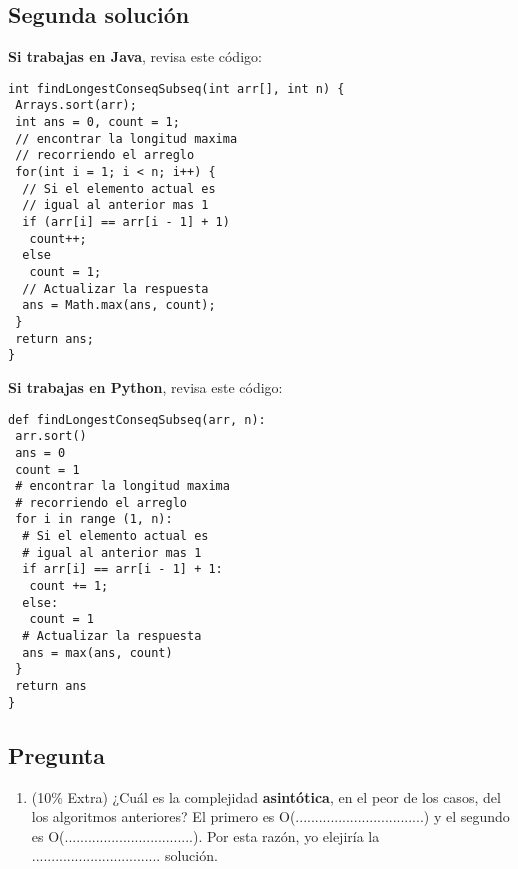 \documentclass[10 pt]{article}
\begin{document}
\begin{multicols}{2}
\subsection{Segunda solución}

\textbf{Si trabajas en Java}, revisa este código: 



{\footnotesize
\begin{lstlisting}
int findLongestConseqSubseq(int arr[], int n) {
 Arrays.sort(arr);   
 int ans = 0, count = 1;    
 // encontrar la longitud maxima
 // recorriendo el arreglo
 for(int i = 1; i < n; i++) {         
  // Si el elemento actual es
  // igual al anterior mas 1
  if (arr[i] == arr[i - 1] + 1)
   count++;
  else
   count = 1;        
  // Actualizar la respuesta
  ans = Math.max(ans, count);
 }
 return ans;
}
\end{lstlisting}
}

\textbf{Si trabajas en Python}, revisa este código:

{\footnotesize
\begin{lstlisting}
def findLongestConseqSubseq(arr, n):
 arr.sort()
 ans = 0 
 count = 1
 # encontrar la longitud maxima
 # recorriendo el arreglo
 for i in range (1, n): 
  # Si el elemento actual es
  # igual al anterior mas 1
  if arr[i] == arr[i - 1] + 1:
   count += 1;
  else:
   count = 1
  # Actualizar la respuesta
  ans = max(ans, count)
 }
 return ans
}
\end{lstlisting}
}


\subsection{Pregunta}

\begin{enumerate}[label=\Alph*]

  \item (10\% Extra) ¿Cuál es la complejidad \textbf{asintótica}, en el peor de los casos, del los algoritmos anteriores? El primero es O(.................................) y el segundo es O(.................................). Por esta razón, yo elejiría la ................................. solución.

\end{enumerate}


\end{multicols}
\end{document}

